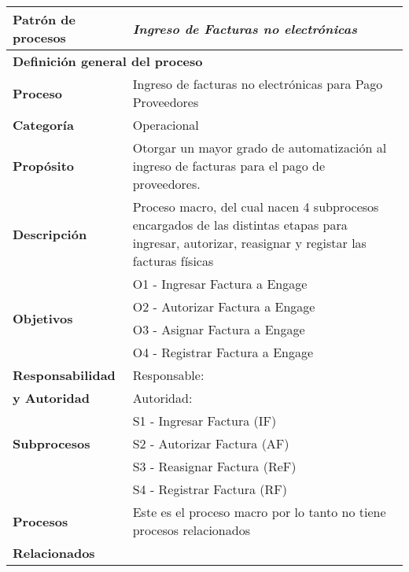 \begin{longtable}{|llrrrrrr|}
	\hline
	\multicolumn{2}{|l|}{\textbf{Patrón de procesos}} & \multicolumn{6}{|l|}{\textit{Ingreso de Facturas no electrónicas}} \\ \hline
	\multicolumn{8}{|l|}{\textbf{Definición general del proceso}} \\ \hline
	\textbf{Proceso} & \multicolumn{7}{|m{12cm}|}{Ingreso de facturas no electrónicas para Pago Proveedores} \\ \hline
	\textbf{Categoría} & \multicolumn{7}{|m{12cm}|}{Operacional} \\ \hline
	\textbf{Propósito} & \multicolumn{7}{|m{12cm}|}{Otorgar un mayor grado de automatización al ingreso de facturas para el pago de proveedores.} \\ \hline
    \textbf{Descripción} & \multicolumn{7}{|m{12cm}|}{Proceso macro, del cual nacen 4 subprocesos encargados de las distintas etapas para ingresar, autorizar, reasignar y registar las facturas físicas} \\ \hline
	\multirow{4}[6]{*}{\textbf{Objetivos}} 
		  & \multicolumn{7}{|l|}{O1 - Ingresar Factura a Engage} \\ \cline{2-8}
          & \multicolumn{7}{|l|}{O2 - Autorizar Factura a Engage} \\ \cline{2-8}
          & \multicolumn{7}{|l|}{O3 - Asignar Factura a Engage} \\ \hline
          & \multicolumn{7}{|l|}{O4 - Registrar Factura a Engage} \\ \hline
    \multicolumn{1}{|l|}{\textbf{Responsabilidad}} 	& \multicolumn{7}{|l|}{Responsable: } \\
	\multicolumn{1}{|l|}{\textbf{y Autoridad}} 	& \multicolumn{7}{|l|}{Autoridad: } \\ \hline
	\multirow{3}[4]{*}{\textbf{Subprocesos}} 
		  & \multicolumn{7}{|l|}{S1 - Ingresar Factura (IF)} \\  \cline{2-8} 
	      & \multicolumn{7}{|l|}{S2 - Autorizar Factura (AF)} \\  \cline{2-8} 
	      & \multicolumn{7}{|l|}{S3 - Reasignar Factura (ReF)} \\ \cline{2-8}
	      & \multicolumn{7}{|l|}{S4 - Registrar Factura (RF)} \\ \hline
    \multicolumn{1}{|l|}{\textbf{Procesos}} 	& \multicolumn{7}{|l|}{Este es el proceso macro por lo tanto no tiene procesos relacionados} \\
	\multicolumn{1}{|l|}{\textbf{Relacionados}} 	&  \multicolumn{7}{|l|}{} \\ \hline

\end{longtable}
